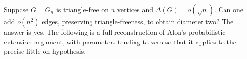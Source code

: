 Suppose $G=G_n$ is triangle-free on $n$ vertices and $\Delta(G)=o(\sqrt n)$. Can one add $o(n^2)$ edges, preserving triangle-freeness, to obtain diameter two? The answer is yes. The following is a full reconstruction of Alon's probabilistic extension argument, with parameters tending to zero so that it applies to the precise little-oh hypothesis.
